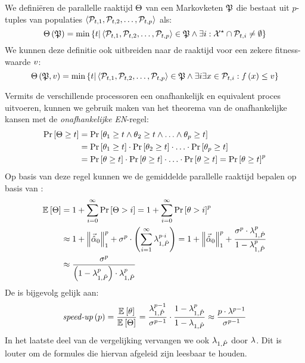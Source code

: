 \begin{definition}
We defini\"eren de parallelle raaktijd $\phittime$ van een Markovketen $\PopChain$ die bestaat uit $p$-tuples van populaties $\tupl{\PopSet_{t,1},\PopSet_{t,2},\ldots,\PopSet_{t,p}}$ als:
\begin{equation}
\fun{\phittime}{\PopChain}=\min\accl{t|\tupl{\PopSet_{t,1},\PopSet_{t,2},\ldots,\PopSet_{t,p}}\in\PopChain\wedge\exists i:\ConfigOpSet\cap \PopSet_{t,i}\neq\emptyset}
\end{equation}
We kunnen deze definitie ook uitbreiden naar de raaktijd voor een zekere fitness-waarde $\fitnessval$:
\begin{equation}
\fun{\phittime}{\PopChain,\fitnessval}=\min\accl{t|\tupl{\PopSet_{t,1},\PopSet_{t,2},\ldots,\PopSet_{t,p}}\in\PopChain\wedge\exists i\exists \sol\in\PopSet_{t,i}:\fun{\evalfun}{\sol}\leq \fitnessval}
\end{equation}
\end{definition}
Vermits de verschillende processoren een onafhankelijk en equivalent proces uitvoeren, kunnen we gebruik maken van het theorema van de onafhankelijke kansen met de \emph{onafhankelijke EN}-regel:
\begin{equation}
\begin{aligned}
\Prob{\phittime\geq t}&=\Prob{\hittime_1\geq t\wedge\hittime_2\geq t\wedge\ldots\wedge\hittime_p\geq t}\\
&=\Prob{\hittime_1\geq t}\cdot\Prob{\hittime_2\geq t}\cdot\ldots\cdot\Prob{\hittime_p\geq t}\\
&=\Prob{\hittime\geq t}\cdot\Prob{\hittime\geq t}\cdot\ldots\cdot\Prob{\hittime\geq t}=\Prob{\hittime\geq t}^p
\end{aligned}
\end{equation}
Op basis van deze regel kunnen we de gemiddelde parallelle raaktijd bepalen op basis van :
\begin{equation}
\begin{aligned}
\mean{\phittime}&=1+\displaystyle\sum_{i=0}^{\infty}{\Prob{\phittime>i}}=1+\displaystyle\sum_{i=0}^{\infty}{\Prob{\hittime>i}^p}\\
&\approx 1+\dabs[1]{\probdistnormmeta{0}}^p+\metapa^p\cdot\brak{\displaystyle\sum_{i=1}^{\infty}\ev[1,\removmat]^{p\cdot i}}=1+\dabs[1]{\probdistnormmeta{0}}^p+\displaystyle\frac{\metapa^p\cdot\ev[1,\removmat]^p}{1-\ev[1,\removmat]^p}\\
&\approx\displaystyle\frac{\metapa^p}{\brak{1-\ev[1,\removmat]^p}\cdot\ev[1,\removmat]^{p}}
\end{aligned}
\end{equation}
De \absu{} is bijgevolg gelijk aan:
\begin{equation}
\funm{\absu{}}{p}=\displaystyle\frac{\mean{\hittime}}{\mean{\phittime}}=\displaystyle\frac{\ev[1,\removmat]^{p-1}}{\metapa^{p-1}}\cdot\displaystyle\frac{1-\ev[1,\removmat]^{p}}{1-\ev[1,\removmat]}\approx\displaystyle\frac{p\cdot\metapb^{p-1}}{\metapa^{p-1}}
\eqnlab{speedupMetaheuristic}
\end{equation}
In het laatste deel van de vergelijking vervangen we ook $\ev[1,\removmat]$ door $\metapb$. Dit is louter om de formules die hiervan afgeleid zijn leesbaar te houden.

